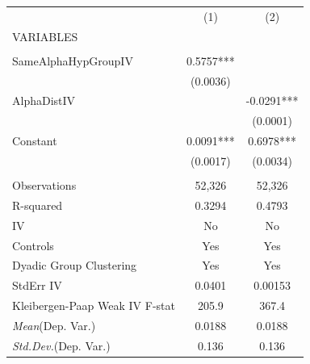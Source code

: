 \documentclass[]{article}
\begin{document}
\begin{tabular}{lcc} \hline
 & (1) & (2) \\
VARIABLES &  &  \\ \hline
 &  &  \\
SameAlphaHypGroupIV & 0.5757*** &  \\
 & (0.0036) &  \\
AlphaDistIV &  & -0.0291*** \\
 &  & (0.0001) \\
Constant & 0.0091*** & 0.6978*** \\
 & (0.0017) & (0.0034) \\
 &  &  \\
Observations & 52,326 & 52,326 \\
R-squared & 0.3294 & 0.4793 \\
IV & No & No \\
Controls & Yes & Yes \\
Dyadic Group Clustering & Yes & Yes \\
StdErr IV & 0.0401 & 0.00153 \\
Kleibergen-Paap Weak IV F-stat & 205.9 & 367.4 \\
\textit{Mean}(Dep. Var.) & 0.0188 & 0.0188 \\
 \textit{Std.Dev.}(Dep. Var.) & 0.136 & 0.136 \\ \hline
\end{tabular}
\end{document}
